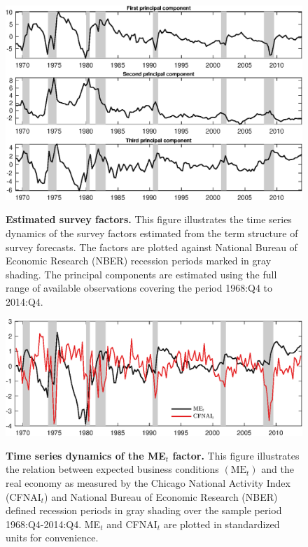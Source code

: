 \documentclass[12pt,a4paper,onecolumn,oneside,notitlepage]{article}
\begin{document}
\clearpage
\begin{figure}[htbp]
    \caption{
        \textbf{Estimated survey factors.} \newline
        This figure illustrates the time series dynamics of the survey factors estimated from the term structure of survey forecasts. The factors are plotted against National Bureau of Economic Research (NBER) recession periods marked in gray shading. The principal components are estimated using the full range of available observations covering the period 1968:Q4 to 2014:Q4. 
    }
    \centering
    \includegraphics[scale=1]{Figures/e_principal_components.eps}
    \label{Fig:e_principal_components}
\end{figure}


\clearpage
\begin{figure}[htbp]
    \caption{
        \textbf{Time series dynamics of the ME$_{t}$ factor.} \newline
        This figure illustrates the relation between expected business conditions $\left(\text{ME}_{t}\right)$ and the real economy as measured by the Chicago National Activity Index (CFNAI$_{t}$) and National Bureau of Economic Research (NBER) defined recession periods in gray shading over the sample period 1968:Q4-2014:Q4. ME$_{t}$ and CFNAI$_{t}$ are plotted in standardized units for convenience. 
    }
    \centering
    \includegraphics[scale=1]{Figures/e_me_cfnai.eps}
    \label{Fig:e_me_cfnai}
\end{figure}
\end{document}
